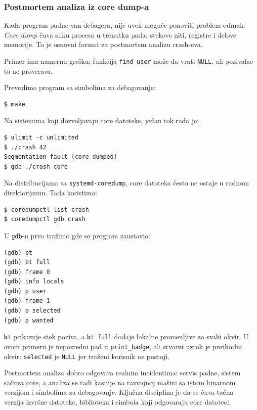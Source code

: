 \subsubsection{Postmortem analiza iz core dump-a}\label{gdb-core-dump}

Kada program padne van debagera, nije uvek moguće ponoviti problem odmah. \emph{Core dump} čuva sliku procesa u trenutku pada: stekove niti, registre i delove memorije. To je osnovni format za postmortem analizu crash-eva.

Primer ima namernu grešku: funkcija \texttt{find\_user} može da vrati \texttt{NULL}, ali pozivalac to ne proverava.


Prevodimo program sa simbolima za debagovanje:

\begin{verbatim}
$ make
\end{verbatim}

Na sistemima koji dozvoljavaju core datoteke, jedan tok rada je:

\begin{verbatim}
$ ulimit -c unlimited
$ ./crash 42
Segmentation fault (core dumped)
$ gdb ./crash core
\end{verbatim}

Na distribucijama sa \texttt{systemd-coredump}, core datoteka često ne ostaje u radnom direktorijumu. Tada koristimo:

\begin{verbatim}
$ coredumpctl list crash
$ coredumpctl gdb crash
\end{verbatim}

U \texttt{gdb}-u prvo tražimo gde se program zaustavio:

\begin{verbatim}
(gdb) bt
(gdb) bt full
(gdb) frame 0
(gdb) info locals
(gdb) p user
(gdb) frame 1
(gdb) p selected
(gdb) p wanted
\end{verbatim}

\texttt{bt} prikazuje stek poziva, a \texttt{bt full} dodaje lokalne promenljive za svaki okvir. U ovom primeru je neposredni pad u \texttt{print\_badge}, ali stvarni uzrok je prethodni okvir: \texttt{selected} je \texttt{NULL} jer traženi korisnik ne postoji.

Postmortem analiza dobro odgovara realnim incidentima: servis padne, sistem sačuva core, a analiza se radi kasnije na razvojnoj mašini sa istom binarnom verzijom i simbolima za debagovanje. Ključna disciplina je da se čuva tačna verzija izvršne datoteke, biblioteka i simbola koji odgovaraju core datoteci.
